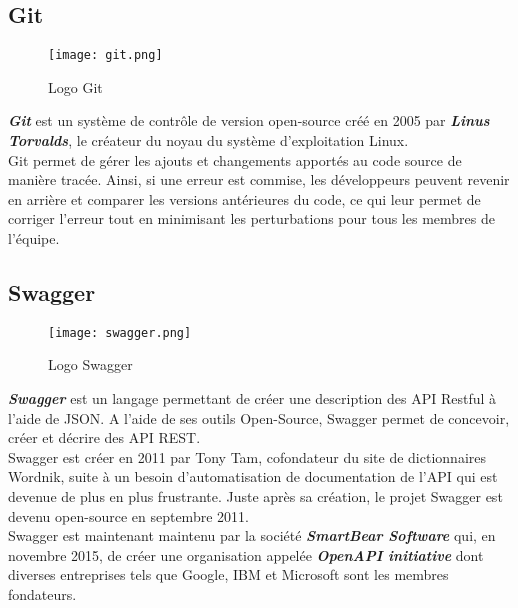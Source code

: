 \subsection{Git}
\vspace{1cm}
\begin{figure}[H]
    \centering
    \texttt{[image: git.png]}
    \vspace{.5cm}
    \caption{Logo Git}
    \label{fig:git_logo}
\end{figure}
\textit{\textbf{Git}} est un système de contrôle de version open-source créé en 2005 par \textit{\textbf{Linus Torvalds}}, le créateur du noyau du système d'exploitation Linux.\\
\noindent Git permet de gérer les ajouts et changements apportés au code source de manière tracée. Ainsi, si une erreur est commise, les développeurs peuvent revenir en arrière et comparer les versions antérieures du code, ce qui leur permet de corriger l'erreur tout en minimisant les perturbations pour tous les membres de l'équipe.
\subsection{Swagger}
\vspace{1cm}
\begin{figure}[H]
    \centering
    \texttt{[image: swagger.png]}
    \vspace{.5cm}
    \caption{Logo Swagger}
    \label{fig:swagger_logo}
\end{figure}
\textit{\textbf{Swagger}} est un langage permettant de créer une description des API Restful à l'aide de JSON. A l'aide de ses outils Open-Source, Swagger permet de concevoir, créer et décrire des API REST.\\
\noindent Swagger est créer en 2011 par Tony Tam, cofondateur du site de dictionnaires Wordnik, suite à un besoin d'automatisation de documentation de l'API qui est devenue de plus en plus frustrante. Juste après sa création, le projet Swagger est devenu open-source en septembre 2011.\\
\noindent Swagger est maintenant maintenu par la société \textit{\textbf{SmartBear Software}} qui, en novembre 2015, de créer une organisation appelée \textit{\textbf{OpenAPI initiative}} dont diverses entreprises tels que Google, IBM et Microsoft sont les membres fondateurs.\\




